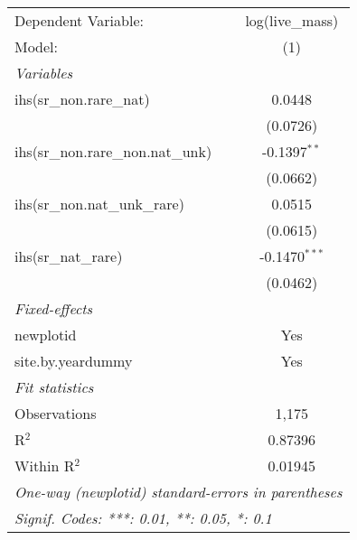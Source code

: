 \begin{tabular}{lc}
\tabularnewline\midrule\midrule
Dependent Variable:&log(live\_mass)\\
Model:&(1)\\
\midrule \emph{Variables}&  \\
ihs(sr\_non.rare\_nat)&0.0448\\
  &(0.0726)\\
ihs(sr\_non.rare\_non.nat\_unk)&-0.1397$^{**}$\\
  &(0.0662)\\
ihs(sr\_non.nat\_unk\_rare)&0.0515\\
  &(0.0615)\\
ihs(sr\_nat\_rare)&-0.1470$^{***}$\\
  &(0.0462)\\
\midrule \emph{Fixed-effects}&  \\
newplotid & Yes\\
site.by.yeardummy & Yes\\
\midrule \emph{Fit statistics}&  \\
Observations & 1,175\\
R$^2$ & 0.87396\\
Within R$^2$ & 0.01945\\
\midrule\midrule\multicolumn{2}{l}{\emph{One-way (newplotid) standard-errors in parentheses}}\\
\multicolumn{2}{l}{\emph{Signif. Codes: ***: 0.01, **: 0.05, *: 0.1}}\\
\end{tabular}


